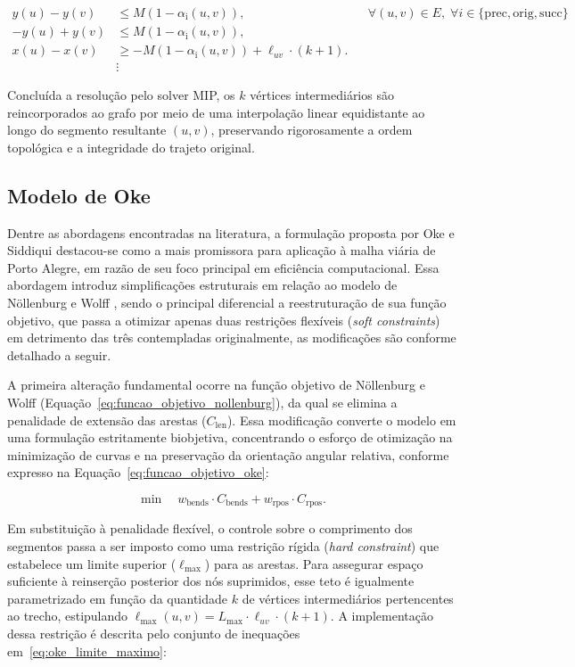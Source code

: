 \documentclass[cic,tc]{infufrgs}
\begin{document}
\begin{align}
y(u) - y(v) &\le M(1 - \alpha_{\text{i}}(u, v)), && \forall (u, v) \in E, \; \forall i \in \{\text{prec}, \text{orig}, \text{succ}\} \label{eq:octi_coords_intermediarios} \\
-y(u) + y(v) &\le M(1 - \alpha_{\text{i}}(u, v)), \nonumber \\
x(u) - x(v) &\ge -M(1 - \alpha_{\text{i}}(u, v)) + \ell_{uv} \cdot (k + 1). \nonumber \\
&\vdots \nonumber
\end{align}

Concluída a resolução pelo solver MIP, os $k$ vértices intermediários são reincorporados ao grafo por meio de uma interpolação linear equidistante ao longo do segmento resultante $(u, v)$, preservando rigorosamente a ordem topológica e a integridade do trajeto original. 

\subsection{Modelo de Oke}
\label{sec:modelo_oke}

Dentre as abordagens encontradas na literatura, a formulação proposta por Oke e Siddiqui \cite{Oke} destacou-se como a mais promissora para aplicação à malha viária de Porto Alegre, em razão de seu foco principal em eficiência computacional. Essa abordagem introduz simplificações estruturais em relação ao modelo de Nöllenburg e Wolff \cite{Nollenburg}, sendo o principal diferencial a reestruturação de sua função objetivo, que passa a otimizar apenas duas restrições flexíveis (\textit{soft constraints}) em detrimento das três contempladas originalmente, as modificações são conforme detalhado a seguir.

A primeira alteração fundamental ocorre na função objetivo de Nöllenburg e Wolff (Equação~\ref{eq:funcao_objetivo_nollenburg}), da qual se elimina a penalidade de extensão das arestas ($C_{\text{len}}$). Essa modificação converte o modelo em uma formulação estritamente biobjetiva, concentrando o esforço de otimização na minimização de curvas e na preservação da orientação angular relativa, conforme expresso na Equação~\ref{eq:funcao_objetivo_oke}:

\begin{equation}
\min \quad w_{\text{bends}} \cdot C_{\text{bends}} + w_{\text{rpos}} \cdot C_{\text{rpos}}.
\label{eq:funcao_objetivo_oke}
\end{equation}

Em substituição à penalidade flexível, o controle sobre o comprimento dos segmentos passa a ser imposto como uma restrição rígida (\textit{hard constraint}) que estabelece um limite superior ($\ell_{\max}$) para as arestas. Para assegurar espaço suficiente à reinserção posterior dos nós suprimidos, esse teto é igualmente parametrizado em função da quantidade $k$ de vértices intermediários pertencentes ao trecho, estipulando $\ell_{\max}(u, v) = L_{\max} \cdot \ell_{uv} \cdot (k + 1)$. A implementação dessa restrição é descrita pelo conjunto de inequações em~\ref{eq:oke_limite_maximo}:
\end{document}
